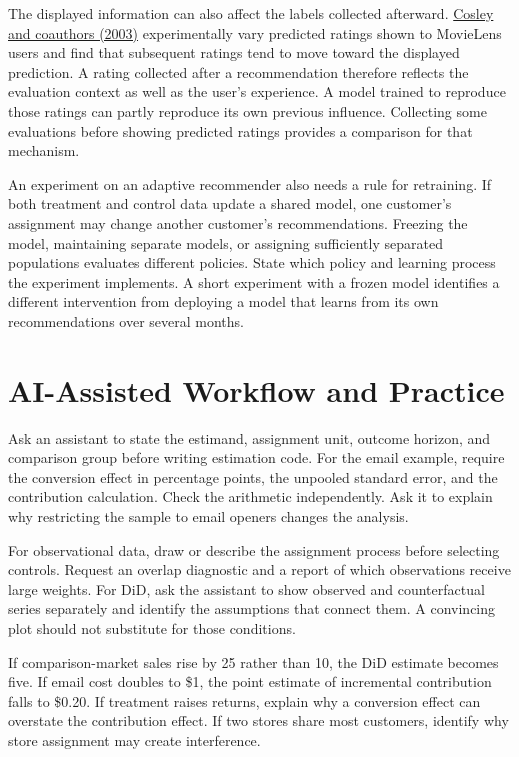The displayed information can also affect the labels collected
afterward.
\href{https://experts.umn.edu/en/publications/is-seeing-believing-how-recommender-interfaces-affect-users-opini/}{Cosley
and coauthors (2003)} experimentally vary predicted ratings shown to
MovieLens users and find that subsequent ratings tend to move toward the
displayed prediction. A rating collected after a recommendation
therefore reflects the evaluation context as well as the user's
experience. A model trained to reproduce those ratings can partly
reproduce its own previous influence. Collecting some evaluations before
showing predicted ratings provides a comparison for that mechanism.

An experiment on an adaptive recommender also needs a rule for
retraining. If both treatment and control data update a shared model,
one customer's assignment may change another customer's recommendations.
Freezing the model, maintaining separate models, or assigning
sufficiently separated populations evaluates different policies. State
which policy and learning process the experiment implements. A short
experiment with a frozen model identifies a different intervention from
deploying a model that learns from its own recommendations over several
months.

\hypertarget{M06-ai-assisted-workflow-and-practice}{%
\section{AI-Assisted Workflow and
Practice}\label{M06-ai-assisted-workflow-and-practice}}

\noindent Ask an assistant to state the estimand, assignment unit, outcome
horizon, and comparison group before writing estimation code. For the
email example, require the conversion effect in percentage points, the
unpooled standard error, and the contribution calculation. Check the
arithmetic independently. Ask it to explain why restricting the sample
to email openers changes the analysis.

For observational data, draw or describe the assignment process before
selecting controls. Request an overlap diagnostic and a report of which
observations receive large weights. For DiD, ask the assistant to show
observed and counterfactual series separately and identify the
assumptions that connect them. A convincing plot should not substitute
for those conditions.

If comparison-market sales rise by 25 rather than 10, the DiD estimate
becomes five. If email cost doubles to \$1, the point estimate of
incremental contribution falls to \$0.20. If treatment raises returns,
explain why a conversion effect can overstate the contribution effect.
If two stores share most customers, identify why store assignment may
create interference.

